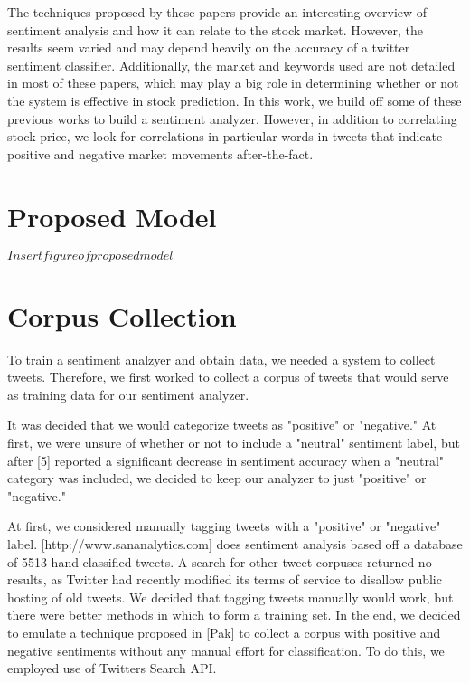 \documentclass[preprint,pre,floats,aps,amsmath,amssymb,12pt]{revtex4}
\begin{document}
The techniques proposed by these papers provide an interesting overview of sentiment analysis and how it can relate to the stock market. However, the results seem varied and may depend heavily on the accuracy of a twitter sentiment classifier. Additionally, the market and keywords used are not detailed in most of these papers, which may play a big role in determining whether or not the system is effective in stock prediction. In this work, we build off some of these previous works to build a sentiment analyzer. However, in addition to correlating stock price, we look for correlations in particular words in tweets that indicate positive and negative market movements after-the-fact. 

\section{Proposed Model}
\label{sec:model}

$Insert figure of proposed model$

\section{Corpus Collection}
\label{sec:mining}
To train a sentiment analzyer and obtain data, we needed a system to collect tweets. Therefore, we first worked to collect a corpus of tweets that would serve as training data for our sentiment analyzer. 

It was decided that we would categorize tweets as "positive" or "negative." At first, we were unsure of whether or not to include a "neutral" sentiment label, but after [5] reported a significant decrease in sentiment accuracy when a "neutral" category was included, we decided to keep our analyzer to just "positive" or "negative." 

At first, we considered manually tagging tweets with a "positive" or "negative" label. [http://www.sananalytics.com] does sentiment analysis based off a database of 5513 hand-classified tweets. A search for other tweet corpuses returned no results, as Twitter had recently modified its terms of service to disallow public hosting of old tweets. We decided that tagging tweets manually would work, but there were better methods in which to form a training set. In the end, we decided to emulate a technique proposed in [Pak] to collect a corpus with positive and negative sentiments without any manual effort for classification. To do this, we employed use of Twitters Search API. 
\end{document}
